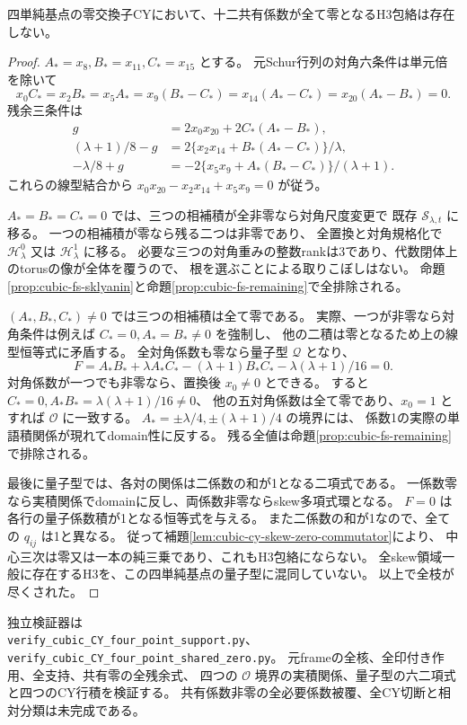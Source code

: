 \begin{theorem}\label{thm:cubic-CY-four-point-shared-zero-empty}
四単純基点の零交換子CYにおいて、十二共有係数が全て零となるH3包絡は存在しない。
\end{theorem}
\begin{proof}
$A_*=x_8,B_*=x_{11},C_*=x_{15}$ とする。
元Schur行列の対角六条件は単元倍を除いて
\[
 x_0C_*=x_2B_*=x_5A_*=x_9(B_*-C_*)
 =x_{14}(A_*-C_*)=x_{20}(A_*-B_*)=0.
\]
残余三条件は
\[
\begin{aligned}
 g&=2x_0x_{20}+2C_*(A_*-B_*),\\
 (\lambda+1)/8-g&=2\{x_2x_{14}+B_*(A_*-C_*)\}/\lambda,\\
 -\lambda/8+g&=-2\{x_5x_9+A_*(B_*-C_*)\}/(\lambda+1).
\end{aligned}
\]
これらの線型結合から
$x_0x_{20}-x_2x_{14}+x_5x_9=0$ が従う。

$A_*=B_*=C_*=0$ では、三つの相補積が全非零なら対角尺度変更で
既存 $\mathcal S_{\lambda,t}$ に移る。
一つの相補積が零なら残る二つは非零であり、
全置換と対角規格化で $\mathcal H^0_\lambda$ 又は $\mathcal H^1_\lambda$ に移る。
必要な三つの対角重みの整数rankは3であり、代数閉体上のtorusの像が全体を覆うので、
根を選ぶことによる取りこぼしはない。
命題\ref{prop:cubic-fs-sklyanin}と命題\ref{prop:cubic-fs-remaining}で全排除される。

$(A_*,B_*,C_*)\ne0$ では三つの相補積は全て零である。
実際、一つが非零なら対角条件は例えば $C_*=0,A_*=B_*\ne0$ を強制し、
他の二積は零となるため上の線型恒等式に矛盾する。
全対角係数も零なら量子型 $\mathcal Q$ となり、
\[
 F=A_*B_*+\lambda A_*C_*-(\lambda+1)B_*C_*-\lambda(\lambda+1)/16=0.
\]
対角係数が一つでも非零なら、置換後 $x_0\ne0$ とできる。
すると $C_*=0,A_*B_*=\lambda(\lambda+1)/16\ne0$、
他の五対角係数は全て零であり、$x_0=1$ とすれば $\mathcal O$ に一致する。
$A_*=\pm\lambda/4,\pm(\lambda+1)/4$ の境界には、
係数1の実際の単語積関係が現れてdomain性に反する。
残る全値は命題\ref{prop:cubic-fs-remaining}で排除される。

最後に量子型では、各対の関係は二係数の和が1となる二項式である。
一係数零なら実積関係でdomainに反し、両係数非零ならskew多項式環となる。
$F=0$ は各行の量子係数積が1となる恒等式を与える。
また二係数の和が1なので、全ての $q_{ij}$ は1と異なる。
従って補題\ref{lem:cubic-cy-skew-zero-commutator}により、
中心三次は零又は一本の純三乗であり、これもH3包絡にならない。
全skew領域一般に存在するH3を、この四単純基点の量子型に混同していない。
以上で全枝が尽くされた。
\end{proof}

独立検証器は\\
\texttt{verify\_cubic\_CY\_four\_point\_support.py}、\\
\texttt{verify\_cubic\_CY\_four\_point\_shared\_zero.py}。
元frameの全核、全印付き作用、全支持、共有零の全残余式、
四つの $\mathcal O$ 境界の実積関係、量子型の六二項式と四つのCY行積を検証する。
共有係数非零の全必要係数被覆、全CY切断と相対分類は未完成である。

